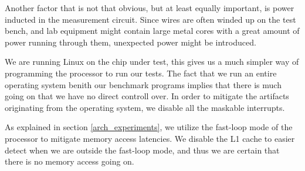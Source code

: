 Another factor that is not that obvious, but at least equally important, is
power inducted in the measurement circuit. Since wires are often winded up on
the test bench, and lab equipment might contain large metal cores with a great
amount of power running through them, unexpected power might be introduced.

We are running Linux on the chip under test, this gives us a much simpler way of
programming the processor to run our tests. The fact that we run an entire
operating system benith our benchmark programs implies that there is much going
on that we have no direct controll over.  In order to mitigate the artifacts
originating from the operating system, we disable all the maskable interrupts.

As explained in section \ref{arch_experiments}, we utilize the fast-loop mode of
the processor to mitigate memory access latencies. We disable the L1 cache to
easier detect when we are outside the fast-loop mode, and thus we are certain
that there is no memory access going on.
